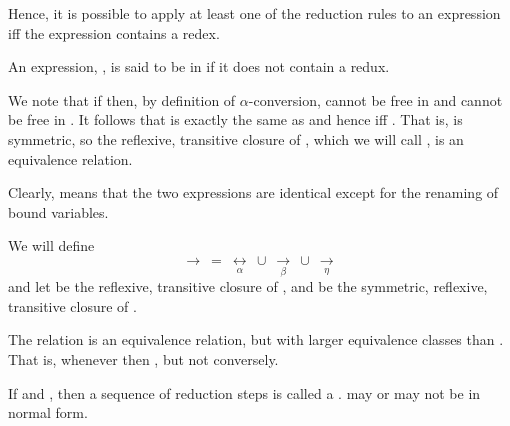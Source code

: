 \documentclass[fleqn]{seminar}
\begin{document}
\begin{slide}
Hence, it is possible to apply at least one of the reduction rules to an
expression iff the expression contains a redex.

An expression, , is said to be in  if it does not contain a redux.

\newpage


We note that if  then, by definition of $\alpha$-conversion,
 cannot be free in  and  cannot be free in
.  It follows that
 is exactly the same as and hence
iff
.
That is, \tm{\underset{\alpha}{\longleftrightarrow}} is symmetric,
so the reflexive, transitive closure of
\tm{\underset{\alpha}{\longleftrightarrow}}, which we will call
\tm{\Leftrightarrow}, is an equivalence relation.

\vspace{2ex}

Clearly,  means that the two expressions
are identical except for the renaming of bound variables.

\newslide

We will define
\color{MathColor}
\[\longrightarrow ~ =  ~ \underset{\alpha}{\longleftrightarrow} ~ \cup
 ~ \underset{\beta}{\longrightarrow} ~ \cup ~ \underset{\eta}{\longrightarrow}\]
\color{black}
and let \tm{\overset{*}{\longrightarrow}} be the reflexive, transitive
closure of \tm{\longrightarrow}, and \tm{\overset{*}{\longleftrightarrow}}
be the symmetric, reflexive, transitive closure of \tm{\longrightarrow}.

\vspace{2ex}

The relation \tm{\overset{*}{\longleftrightarrow}} is an equivalence relation,
but with larger equivalence classes than
\tm{\Leftrightarrow}.
That is, whenever  then
, but not conversely.

\newslide

If  and ,
then a sequence of reduction steps
is called a .   may or may not be
in normal form.



\end{slide}
\end{document}
